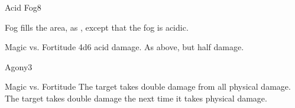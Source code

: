 \begin{spellsection}{Acid Fog}{8}
\begin{spellheader}
\end{spellheader}
\begin{spellcontent}
    \begin{spelltargetinginfo}
    \end{spelltargetinginfo}
    \begin{spelleffects}
        \spelleffect Fog fills the area, as , except that the fog is acidic.
        \spelldur \durshort
    \end{spelleffects}
\end{spellcontent}
\begin{spellsubcontent}
    \begin{spelltargetinginfo}
    \end{spelltargetinginfo}
    \begin{spelleffects}
        \begin{spellattack}{Magic vs. Fortitude}
            \spellsuccess 4d6 acid damage.
            \spellfailure As above, but half damage.
        \end{spellattack}
    \end{spelleffects}
\end{spellsubcontent}
\begin{spellfooter}
    \spellnotes \physicalspellnotes
\end{spellfooter}
\end{spellsection}

\begin{spellsection}{Agony}{3}
\begin{spellheader}
\end{spellheader}
\begin{spellcontent}
    \begin{spelltargetinginfo}
    \end{spelltargetinginfo}
    \begin{spelleffects}
        \begin{spellattack}{Magic vs. Fortitude}
            \spellsuccess The target takes double damage from all physical damage.
            \spellfailure The target takes double damage the next time it takes physical damage.
        \end{spellattack}
        \spelldur \durshort
    \end{spelleffects}
\end{spellcontent}
\begin{spellfooter}
\end{spellfooter}
\end{spellsection}

